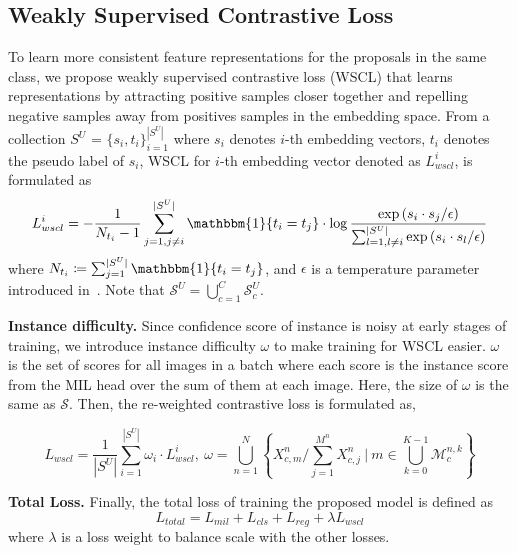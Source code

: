 \documentclass[runningheads]{llncs}
\begin{document}
\subsection{Weakly Supervised Contrastive Loss}

To learn more consistent feature representations for the proposals in the same class, we propose weakly supervised contrastive loss (WSCL) that learns representations by attracting positive samples closer together and repelling negative samples away from positives samples in the embedding space.
From a collection $S^U$ = $\{s_i, t_i\}_{i=1}^{|S^U|}$ where $s_i$ denotes $i$-th embedding vectors, $t_i$ denotes the pseudo label of $s_i$, WSCL for $i$-th embedding vector denoted as $L^{i}_{wscl}$, is formulated as
\begin{equation}
  L^{i}_{wscl} = -\frac{1}{N_{t_i}-1}\sum_{j=1,j\neq i}^{|S^U|}{\mathbbm{1}\{t_i=t_j\}}\cdot\log{\frac{\exp{(s_i\cdot s_j/\epsilon)}}{\sum_{l=1,l\neq i}^{|S^U|} \exp{(s_i\cdot s_l/ \epsilon)}}}\\
\label{eq:wscl_i}
\end{equation}
where $N_{t_i} \coloneqq \sum_{j=1}^{|S^U|}{\mathbbm{1}\{t_i=t_j\}} $, and $\epsilon$ is a temperature parameter introduced in~\cite{khosla2020supervised}.
Note that $\mathcal{S}^U = \bigcup_{c=1}^C \mathcal{S}^U_c$.


\noindent\textbf{Instance difficulty.}
Since confidence score of instance is noisy at early stages of training, we introduce instance difficulty $\omega$ to make training for WSCL easier.
$\omega$ is the set of scores for all images in a batch where each score is the instance score from the MIL head over the sum of them at each image.
Here, the size of $\omega$ is the same as $\mathcal{S}$.
Then, the re-weighted contrastive loss is formulated as,





\begin{equation}
L_{wscl} = \frac{1}{|S^U|}\sum_{i=1}^{|S^U|} \omega_{i}\cdot L^{i}_{wscl}, \ \omega = \bigcup_{n=1}^N \left\{ {X^n_{c,m}} / \sum_{j=1}^{M^n} X^{n}_{c,j} \ | \ m \in \bigcup_{k=0}^{K-1} \mathcal{M}^{n,k}_c \right\}
\label{eq:wscl}
\end{equation}


\noindent\textbf{Total Loss.}
Finally, the total loss of training the proposed model is defined as
\begin{equation}
  L_{total} = L_{mil} + L_{cls} + L_{reg} + \lambda L_{wscl}
\label{eq:tot_loss}
\end{equation}
where $\lambda$ is a loss weight to balance scale with the other losses.
\end{document}
